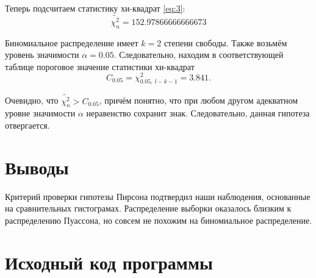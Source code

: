 \documentclass[12pt]{article}
\begin{document}
Теперь подсчитаем статистику хи-квадрат \eqref{eq:3}:
$$\widetilde{\chi^2_n} = 152.97866666666673$$

Биномиальное распределение имеет $k = 2$ степени свободы. Также
возьмём уровень значимости $\alpha = 0.05$. Следовательно,
находим в соответствующей таблице пороговое значение статистики хи-квадрат
$$C_{0.05} = \chi^2_{0.05,\  l - k - 1} = 3.841.$$

Очевидно, что $\widetilde{\chi^2_n} > C_{0.05}$, причём понятно, что при любом другом
адекватном уровне значимости $\alpha$ неравенство сохранит знак. Следовательно,
данная гипотеза отвергается.
\section{Выводы}

Критерий проверки гипотезы Пирсона подтвердил наши наблюдения, основанные на
сравнительных гистограмах. Распределение выборки оказалось близким к распределению
Пуассона, но совсем не похожим на биномиальное распределение.
\section{Исходный код программы}

\end{document}
